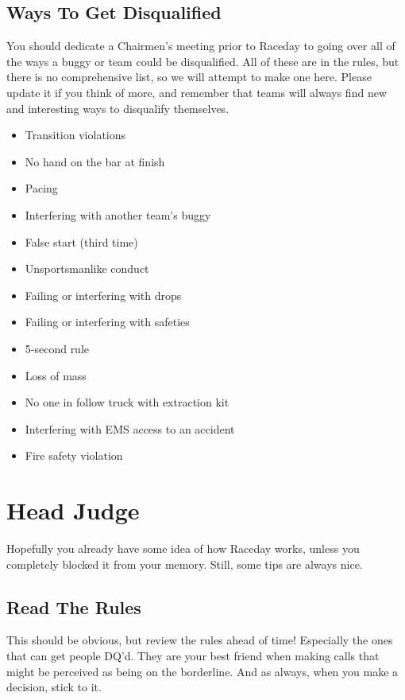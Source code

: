 \subsection{Ways To Get Disqualified}
You should dedicate a Chairmen's meeting prior to Raceday to going over all
of the ways a buggy or team could be disqualified. All of these are in the
rules, but there is no comprehensive list, so we will attempt to make one
here. Please update it if you think of more, and remember that teams will
always find new and interesting ways to disqualify themselves.
\begin{itemize}
\item Transition violations
\item No hand on the bar at finish
\item Pacing
\item Interfering with another team's buggy
\item False start (third time)
\item Unsportsmanlike conduct
\item Failing or interfering with drops
\item Failing or interfering with safeties
\item 5-second rule
\item Loss of mass
\item No one in follow truck with extraction kit
\item Interfering with EMS access to an accident
\item Fire safety violation

\end{itemize}

\section{Head Judge}
\label{sec:HeadJudge}
Hopefully you already have some idea of how Raceday works, unless you
completely blocked it from your memory. Still, some tips are always nice.

\subsection{Read The Rules}
This should be obvious, but review the rules ahead of time! Especially the
ones that can get people DQ'd. They are your best friend when making calls
that might be perceived as being on the borderline. And as always, when you
make a decision, stick to it.

